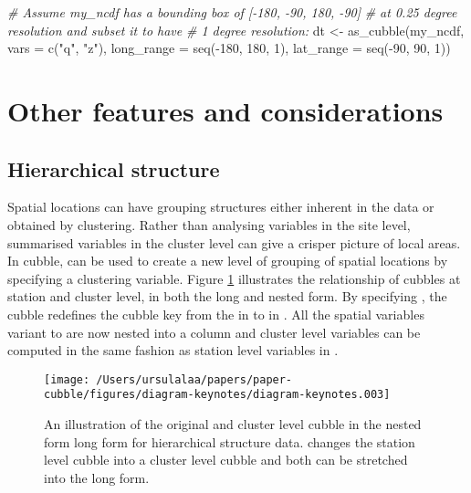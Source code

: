 \documentclass{article}
\newenvironment{Shaded}{\begin{snugshade}}{\end{snugshade}}
\newcommand{\AttributeTok}[1]{\textcolor[rgb]{0.77,0.63,0.00}{#1}}
\newcommand{\CommentTok}[1]{\textcolor[rgb]{0.56,0.35,0.01}{\textit{#1}}}
\newcommand{\DecValTok}[1]{\textcolor[rgb]{0.00,0.00,0.81}{#1}}
\newcommand{\FunctionTok}[1]{\textcolor[rgb]{0.00,0.00,0.00}{#1}}
\newcommand{\NormalTok}[1]{#1}
\newcommand{\OtherTok}[1]{\textcolor[rgb]{0.56,0.35,0.01}{#1}}
\newcommand{\SpecialCharTok}[1]{\textcolor[rgb]{0.00,0.00,0.00}{#1}}
\newcommand{\StringTok}[1]{\textcolor[rgb]{0.31,0.60,0.02}{#1}}
\begin{document}
\begin{Shaded}
\begin{Highlighting}[]
\CommentTok{\# Assume my\_ncdf has a bounding box of [{-}180, {-}90, 180, {-}90]}
\CommentTok{\# at 0.25 degree resolution and subset it to have}
\CommentTok{\# 1 degree resolution:}
\NormalTok{dt }\OtherTok{\textless{}{-}} \FunctionTok{as\_cubble}\NormalTok{(my\_ncdf, }\AttributeTok{vars =} \FunctionTok{c}\NormalTok{(}\StringTok{"q"}\NormalTok{, }\StringTok{"z"}\NormalTok{),}
                \AttributeTok{long\_range =} \FunctionTok{seq}\NormalTok{(}\SpecialCharTok{{-}}\DecValTok{180}\NormalTok{, }\DecValTok{180}\NormalTok{, }\DecValTok{1}\NormalTok{),}
                \AttributeTok{lat\_range =} \FunctionTok{seq}\NormalTok{(}\SpecialCharTok{{-}}\DecValTok{90}\NormalTok{, }\DecValTok{90}\NormalTok{, }\DecValTok{1}\NormalTok{))}
\end{Highlighting}
\end{Shaded}

\hypertarget{others}{%
\section{Other features and considerations}\label{others}}

\hypertarget{hierarchical-structure}{%
\subsection{Hierarchical structure}\label{hierarchical-structure}}

Spatial locations can have grouping structures either inherent in the data or obtained by clustering. Rather than analysing variables in the site level, summarised variables in the cluster level can give a crisper picture of local areas. In cubble,  can be used to create a new level of grouping of spatial locations by specifying a clustering variable. Figure \ref{fig:illu-hier} illustrates the relationship of cubbles at station and cluster level, in both the long and nested form. By specifying , the cubble redefines the cubble key from the  in  to  in . All the spatial variables variant to  are now nested into a  column and cluster level variables can be computed in the same fashion as station level variables in .

\begin{figure}

{\centering \texttt{[image: /Users/ursulalaa/papers/paper-cubble/figures/diagram-keynotes/diagram-keynotes.003]} 

}

\caption{An illustration of the original and cluster level cubble in the nested form long form for hierarchical structure data.  changes the station level cubble into a cluster level cubble and both can be stretched into the long form.}\label{fig:illu-hier}
\end{figure}
\end{document}
